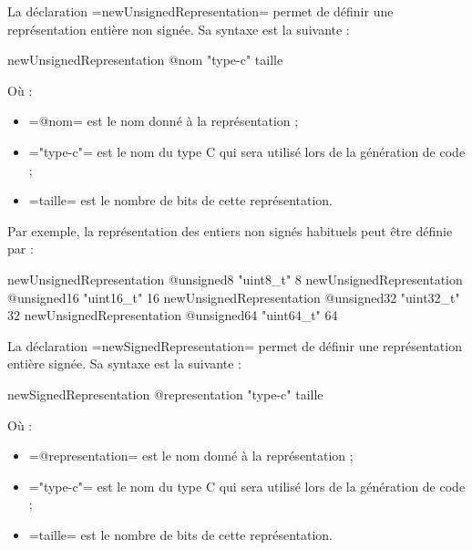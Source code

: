 






La déclaration \plm=newUnsignedRepresentation= permet de définir une représentation entière non signée. Sa syntaxe est la suivante :


\begin{PLM}
newUnsignedRepresentation @nom "type-c" taille
\end{PLM}

Où :
\begin{itemize}
  \item \plm=@nom= est le nom donné à la représentation ;
  \item \plm="type-c"= est le nom du type C qui sera utilisé lors de la génération de code ;
  \item \plm=taille= est le nombre de bits de cette représentation.
\end{itemize}

Par exemple, la représentation des entiers non signés habituels peut être définie par :
\begin{PLM}
newUnsignedRepresentation @unsigned8  "uint8_t"   8
newUnsignedRepresentation @unsigned16 "uint16_t" 16
newUnsignedRepresentation @unsigned32 "uint32_t" 32
newUnsignedRepresentation @unsigned64 "uint64_t" 64
\end{PLM}









La déclaration \plm=newSignedRepresentation= permet de définir une représentation entière signée. Sa syntaxe est la suivante :


\begin{PLM}
newSignedRepresentation @representation "type-c" taille
\end{PLM}

Où :
\begin{itemize}
  \item \plm=@representation= est le nom donné à la représentation ;
  \item \plm="type-c"= est le nom du type C qui sera utilisé lors de la génération de code ;
  \item \plm=taille= est le nombre de bits de cette représentation.
\end{itemize}

